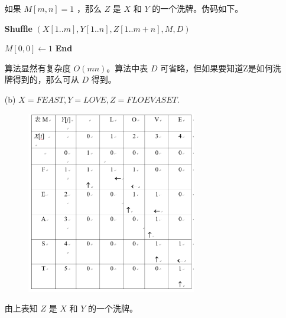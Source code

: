 \documentclass[12pt,a4paper]{article}
\begin{document}
\begin{CJK}{UTF8}{song}
\begin{enumerate}
	如果 $M[m, n] = 1$ ，那么 $Z$ 是 $X$ 和 $Y$ 的一个洗牌。伪码如下。\\
		\begin{algorithm}[H]
		\caption{\textbf{Shuffle} $(X[1..m], Y[1..n], Z[1..m+n],M,D)$}
		$M[0, 0]\gets 1$\;
		\textbf{End}\
	\end{algorithm}
	算法显然有复杂度 $O(mn)$。算法中表 $D$ 可省略，但如果要知道Z是如何洗牌得到的，那么可从 $D$ 得到。
	\item[(b)] 	$X = FEAST, 	Y = LOVE, 	Z =  FLOEVASET$.
	\begin{figure}[H]
		\centering %
		\includegraphics[width=0.7\textwidth]{3(1)} %
	\end{figure}
由上表知 $Z$ 是 $X$ 和 $Y$ 的一个洗牌。
\end{enumerate}		

\end{CJK}
\end{document}

